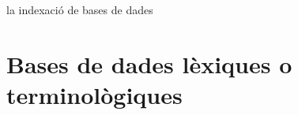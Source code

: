 \begin{persabermes}{la indexació de bases de dades}
\end{persabermes}



\section{Bases de dades lèxiques o terminològiques}
\label{ss:bdterm}

